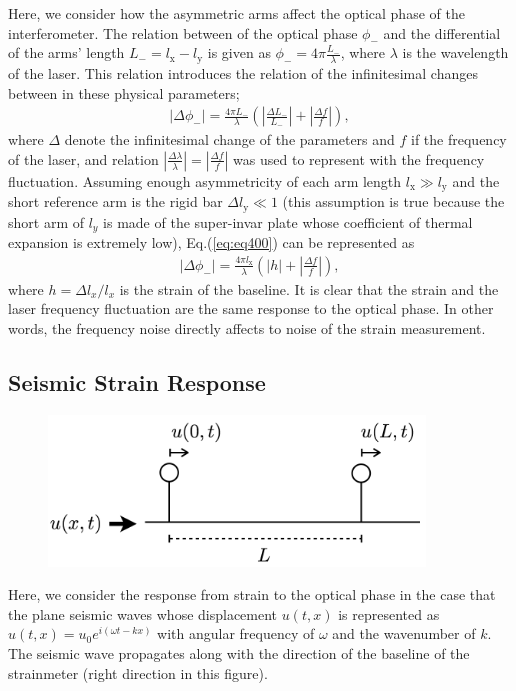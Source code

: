 Here, we consider how the asymmetric arms affect the optical phase of the interferometer. The relation between of the optical phase $\phi_{-}$ and the differential of the arms' length ${L_{-}}=l_{\mathrm{x}}-l_{\mathrm{y}}$ is given as ${\phi}_{-} = 4\pi\frac{{L_{-}}}{\lambda}$, where $\lambda$ is the wavelength of the laser. This relation introduces the relation of the infinitesimal changes between in these physical parameters;
\begin{eqnarray}  
  \left|\Delta \phi_{-}\right| = \frac{4\pi{L_{-}}}{\lambda}\left( \left|\frac{\Delta L_{-}}{L_{-}}\right| + \left|\frac{\Delta f}{f}\right|\right), \label{eq:eq400}
\end{eqnarray}
where $\Delta$ denote the infinitesimal change of the parameters and $f$ if the frequency of the laser, and relation $|\frac{\Delta{\lambda}}{\lambda}| = |\frac{\Delta{f}}{f}|$ was used to represent with the frequency fluctuation. Assuming enough asymmetricity of each arm length $l_{\mathrm{x}} \gg l_{\mathrm{y}}$ and the short reference arm is the rigid bar $\Delta l_{\mathrm{y}} \ll 1$ (this assumption is true because the short arm of $l_y$ is made of the super-invar plate whose coefficient of thermal expansion is extremely low), Eq.(\ref{eq:eq400}) can be represented as
\begin{eqnarray}  
  \left|\Delta \phi_{-}\right| = \frac{4\pi{l_{\mathrm{x}}}}{\lambda}\left( \left|h\right|  + \left|\frac{\Delta f}{f}\right|\right), \label{eq:eq400_a}
\end{eqnarray}
where $h = \Delta{l_{x}}/l_x$ is the strain of the baseline. It is clear that the strain and the laser frequency fluctuation are the same response to the optical phase. In other words, the frequency noise directly affects to noise of the strain measurement.

\newpage
\subsection{Seismic Strain Response}
\begin{figure}[h]
  \centering
  \includegraphics[width=10cm]{./img_chap4/img430.png}
  \caption{} \label{img:img430}
\end{figure}
Here, we consider the response from strain to the optical phase in the case that the plane seismic waves whose displacement $u(t,x)$ is represented as $u(t,x)=u_0e^{i(\omega{t}-kx)}$ with angular frequency of $\omega$ and the wavenumber of $k$. The seismic wave propagates along with the direction of the baseline of the strainmeter (right direction in this figure).

